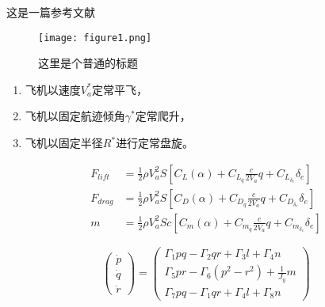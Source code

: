 这是一篇参考文献\cite{NWPUThesisLaTeXTemplate}

\begin{figure}[ht]
\centering
\texttt{[image: figure1.png]}
\caption{这里是个普通的标题	}
\label{fig:example}
\end{figure}

\begin{enumerate}[label=\arabic*.]
\setlength{\itemsep}{0pt}

\item 飞机以速度$V_a^*$定常平飞，
\item 飞机以固定航迹倾角$\gamma^*$定常爬升，
\item 飞机以固定半径$R^*$进行定常盘旋。
\end{enumerate}

\begin{align}
F_{lift}&=\frac{1}{2}\rho V_a^2S [C_L(\alpha)+C_{L_q}\frac{c}{2V_a}q+C_{L_{\delta_e}}\delta_e]\label{eqlift}\\
F_{drag}&=\frac{1}{2}\rho V_a^2S [C_D(\alpha)+C_{D_q}\frac{c}{2V_a}q+C_{D_{\delta_e}}\delta_e]\label{eqdrag}\\
m&=\frac{1}{2}\rho V_a^2Sc [C_m(\alpha)+C_{m_q}\frac{c}{2V_a}q+C_{m_{\delta_e}}\delta_e]\label{eqmom}
\end{align}

\begin{equation*}
\begin{pmatrix}
\dot{p}\\ \dot{q}\\ \dot{r}
\end{pmatrix}
=
\begin{pmatrix}
\Gamma_1 p q -\Gamma_2 q r +\Gamma_3 l+\Gamma_4 n \\
 \Gamma_5 p r-\Gamma_6(p^2-r^2)+\frac{1}{J_y}m\\
 \Gamma_7 p q-\Gamma_1 q r+\Gamma_4 l +\Gamma_8 n
\end{pmatrix}
\end{equation*}
\endinput